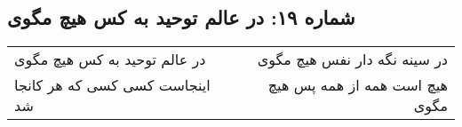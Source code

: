 \begin{center}
\section*{شماره ۱۹: در عالم توحید به کس هیچ مگوی}
\label{sec:019}
\begin{longtable}{l p{0.5cm} r}
در عالم توحید به کس هیچ مگوی
&&
در سینه نگه دار نفس هیچ مگوی
\\
اینجاست کسی کسی که هر کانجا شد
&&
هیچ است همه از همه پس هیچ مگوی
\\
\end{longtable}
\end{center}
